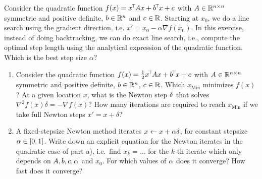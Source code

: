 

\renewcommand{\course}{Optimization Algorithms}
\renewcommand{\coursepicture}{optim}
\renewcommand{\coursedate}{Winter 2024/25}
\renewcommand{\exnum}{Weekly Exercise 2}

\exercises

\providecommand{\Min}{\text{Min}}

\exercisestitle




Consider the quadratic function $f(x) = x^{\!\top\!} A x + b^{\!\top\!} x + c$
with $A\in{\mathbb{R}}^{n\times n}$ symmetric and positive definite,
$b\in{\mathbb{R}}^n$ and $c\in{\mathbb{R}}$.  Starting at $x_0$, we do a line search
using the gradient direction, i.e. $x' = x_0 - \alpha \nabla
f(x_0)$. In this exercise, instead of doing backtracking, we can do
exact line search, i.e., compute the optimal step length using the
analytical expression of the quadratic function. Which is the best
step size $\alpha$?





\begin{enumerate}

\item Consider the quadratic function $f(x) = \frac{1}{2} x^{\!\top\!} A x + b^{\!\top\!} x + c$ with $A\in{\mathbb{R}}^{n\times n}$ symmetric and positive definite,
$b\in{\mathbb{R}}^n$, $c\in{\mathbb{R}}$. Which $x_\Min$ minimizes $f(x)$? At a given location $x$, what is the Newton step $\delta$ that solves $\nabla^2 f(x)\delta = -\nabla f(x)$? How many iterations are required to reach $x_\Min$ if we take full Newton steps $x' = x + \delta $?


\item A fixed-stepsize Newton method iterates $x \gets x + \alpha \delta$, for constant stepsize $\alpha\in[0,1]$. Write down an explicit equation for the Newton iterates in the quadratic case of part a), i.e.\ find
$x_k = \ldots$ for the $k$-th iterate which only depends on $A, b, c, \alpha$
and $x_0$. For which values of $\alpha$ does it converge? How fast does it converge?



\end{enumerate}




